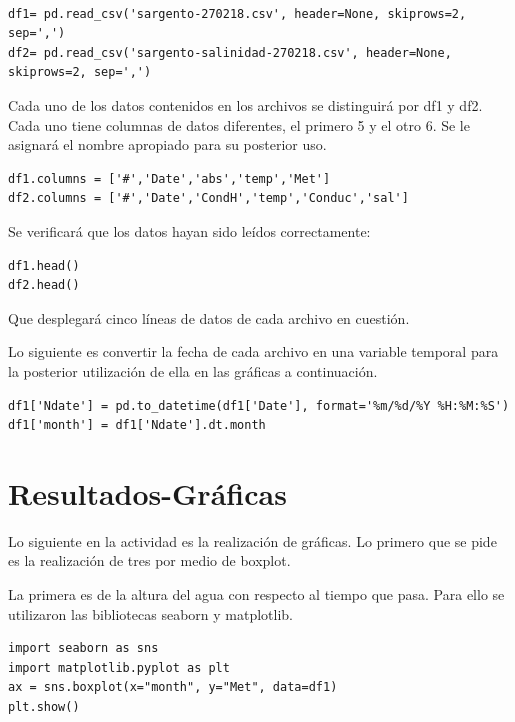 \documentclass{article}
\begin{document}
\begin{verbatim}

df1= pd.read_csv('sargento-270218.csv', header=None, skiprows=2, sep=',')
df2= pd.read_csv('sargento-salinidad-270218.csv', header=None, skiprows=2, sep=',')

\end{verbatim}



Cada uno de los datos contenidos en los archivos se distinguirá por df1 y df2. Cada uno tiene columnas de datos diferentes, el primero 5 y el otro 6. Se le asignará el nombre apropiado para su posterior uso.

\begin{verbatim}
df1.columns = ['#','Date','abs','temp','Met']
df2.columns = ['#','Date','CondH','temp','Conduc','sal']
\end{verbatim}

Se verificará que los datos hayan sido leídos correctamente:

\begin{verbatim}
df1.head()
df2.head()
\end{verbatim}

Que desplegará cinco líneas de datos de cada archivo en cuestión.

Lo siguiente es convertir la fecha de cada archivo en una variable temporal para la posterior utilización de ella en las gráficas a continuación.

\begin{verbatim}
df1['Ndate'] = pd.to_datetime(df1['Date'], format='%m/%d/%Y %H:%M:%S')
df1['month'] = df1['Ndate'].dt.month
\end{verbatim}

\section{Resultados-Gráficas}

Lo siguiente en la actividad es la realización de gráficas. Lo primero que se pide es la realización de tres por medio de boxplot.

La primera es de la altura del agua con respecto al tiempo que pasa. Para ello se utilizaron las bibliotecas seaborn y matplotlib.

\begin{verbatim}
import seaborn as sns
import matplotlib.pyplot as plt
ax = sns.boxplot(x="month", y="Met", data=df1)
plt.show()
\end{verbatim}
\end{document}
